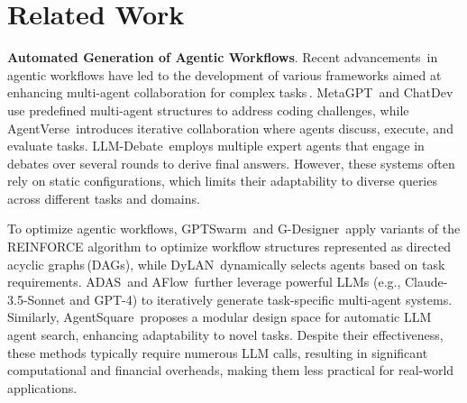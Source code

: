 \section{Related Work} \label{section:related_work}

\textbf{Automated Generation of Agentic Workflows}. Recent advancements\,\citep{rise_agent_survey_25, LLMReasoning_Survey_25, AgenticAI_Survey_25, ALLM_Survey_25} in agentic workflows have led to the development of various frameworks aimed at enhancing multi-agent collaboration for complex tasks\,\citep{LLM_MultiAgents_Survey_IJCAI_24, AutoMLAgent_ICML_25, Flow_ICLR_25, MONAQ_EMNLP_25}. MetaGPT\,\citep{MetaGPT_ICLR_24} and ChatDev\,\citep{ChatDev_ACL_24} use predefined multi-agent structures to address coding challenges, while AgentVerse\,\citep{AgentVerse_ICLR_24} introduces iterative collaboration where agents discuss, execute, and evaluate tasks. LLM-Debate\,\citep{LLMDebate_ICML_24} employs multiple expert agents that engage in debates over several rounds to derive final answers. However, these systems often rely on static configurations, which limits their adaptability to diverse queries across different tasks and domains.

To optimize agentic workflows, GPTSwarm\,\citep{GPTSwarm_ICML24} and G-Designer\,\citep{GDesigner_ICML_25} apply variants of the REINFORCE algorithm to optimize workflow structures represented as directed acyclic graphs\,(DAGs), while DyLAN\,\citep{DyLAN_COLM_24} dynamically selects agents based on task requirements. ADAS\,\citep{ADAS_ICLR_25} and AFlow\,\citep{AFlow_ICLR_25} further leverage powerful LLMs (e.g., Claude-3.5-Sonnet and GPT-4) to iteratively generate task-specific multi-agent systems. Similarly, AgentSquare\,\citep{AgentSquare_ICLR_25} proposes a modular design space for automatic LLM agent search, enhancing adaptability to novel tasks. Despite their effectiveness, these methods typically require numerous LLM calls, resulting in significant computational and financial overheads, making them less practical for real-world applications.

